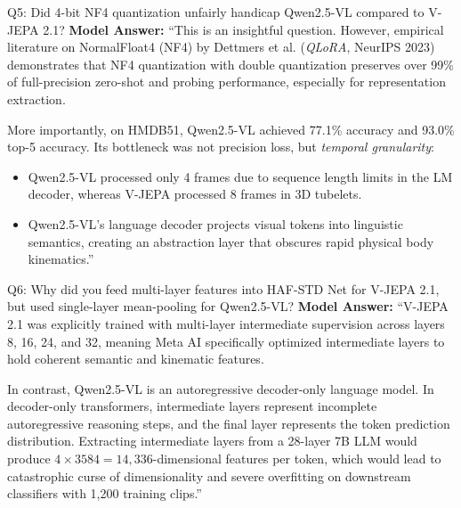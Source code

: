 \documentclass[a4paper, 11pt]{article}
\begin{document}
\vspace{0.2cm}

\begin{defensebox}{Q5: Did 4-bit NF4 quantization unfairly handicap Qwen2.5-VL compared to V-JEPA 2.1?}
\textbf{Model Answer:}
``This is an insightful question. However, empirical literature on NormalFloat4 (NF4) by Dettmers et al. (\emph{QLoRA}, NeurIPS 2023) demonstrates that NF4 quantization with double quantization preserves over 99\% of full-precision zero-shot and probing performance, especially for representation extraction.

More importantly, on HMDB51, Qwen2.5-VL achieved 77.1\% accuracy and 93.0\% top-5 accuracy. Its bottleneck was not precision loss, but \emph{temporal granularity}:
\begin{itemize}
    \item Qwen2.5-VL processed only 4 frames due to sequence length limits in the LM decoder, whereas V-JEPA processed 8 frames in 3D tubelets.
    \item Qwen2.5-VL's language decoder projects visual tokens into linguistic semantics, creating an abstraction layer that obscures rapid physical body kinematics.''
\end{itemize}
\end{defensebox}

\vspace{0.2cm}

\begin{defensebox}{Q6: Why did you feed multi-layer features into HAF-STD Net for V-JEPA 2.1, but used single-layer mean-pooling for Qwen2.5-VL?}
\textbf{Model Answer:}
``V-JEPA 2.1 was explicitly trained with multi-layer intermediate supervision across layers 8, 16, 24, and 32, meaning Meta AI specifically optimized intermediate layers to hold coherent semantic and kinematic features.

In contrast, Qwen2.5-VL is an autoregressive decoder-only language model. In decoder-only transformers, intermediate layers represent incomplete autoregressive reasoning steps, and the final layer represents the token prediction distribution. Extracting intermediate layers from a 28-layer 7B LLM would produce $4 \times 3584 = 14{,}336$-dimensional features per token, which would lead to catastrophic curse of dimensionality and severe overfitting on downstream classifiers with 1,200 training clips.''
\end{defensebox}

\vspace{0.2cm}
\end{document}
